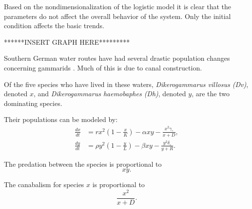 \documentclass[landscape,final,a0paper,fontscale=0.285]{baposter}
\begin{document}
\begin{poster}
{Based on the nondimensionalization of the logistic model it is clear that the parameters do not affect the overall behavior of the system. Only the initial condition affects the basic trends. 


******INSERT GRAPH HERE*********
}
{
Southern German water routes have had several drastic population
changes concerning gammarids \cite{Dikerogammarus}. Much of this is due to canal construction.

 Of the five species who have lived in these waters, \textit{Dikerogammarus villosus (Dv)}, denoted $x$, and \textit{Dikerogammarus haemobaphes (Dh)}, denoted $y$, are the two dominating species.
	
}

{

Their populations can be modeled by:
   \begin{align*}
    \frac{dx}{dt} & = rx^2 \left(1-\frac{x}{K}\right) - \alpha xy - \frac{x^2 \gamma_\circ}{x+D}, \\
    \frac{dy}{dt} & = \rho y^2 \left(1-\frac{y}{L}\right) - \beta xy -\frac{y^2 \delta_\circ}{y+R}.
  \end{align*}
  
  The predation between the species is proportional to $$xy.$$
  
  The canabalism for species $x$ is proportional to $$\frac{x^2}{x+D}.$$
  
}
\end{poster}
\end{document}
